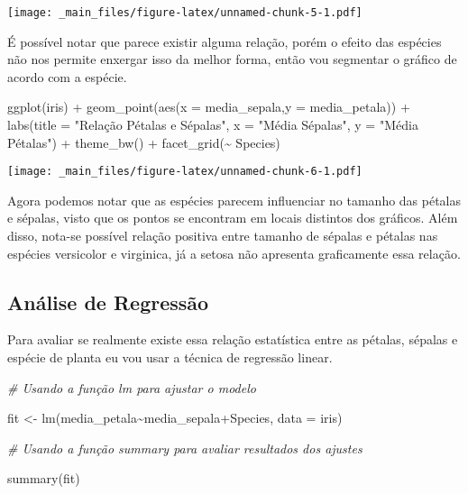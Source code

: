 \documentclass[
]{book}
\newenvironment{Shaded}{\begin{snugshade}}{\end{snugshade}}
\newcommand{\AttributeTok}[1]{\textcolor[rgb]{0.77,0.63,0.00}{#1}}
\newcommand{\CommentTok}[1]{\textcolor[rgb]{0.56,0.35,0.01}{\textit{#1}}}
\newcommand{\FunctionTok}[1]{\textcolor[rgb]{0.00,0.00,0.00}{#1}}
\newcommand{\NormalTok}[1]{#1}
\newcommand{\OtherTok}[1]{\textcolor[rgb]{0.56,0.35,0.01}{#1}}
\newcommand{\SpecialCharTok}[1]{\textcolor[rgb]{0.00,0.00,0.00}{#1}}
\newcommand{\StringTok}[1]{\textcolor[rgb]{0.31,0.60,0.02}{#1}}
\begin{document}
\texttt{[image: \_main\_files/figure-latex/unnamed-chunk-5-1.pdf]}

É possível notar que parece existir alguma relação, porém o efeito das espécies não nos permite enxergar isso da melhor forma, então vou segmentar o gráfico de acordo com a espécie.

\begin{Shaded}
\begin{Highlighting}[]
\FunctionTok{ggplot}\NormalTok{(iris) }\SpecialCharTok{+}
  \FunctionTok{geom\_point}\NormalTok{(}\FunctionTok{aes}\NormalTok{(}\AttributeTok{x =}\NormalTok{ media\_sepala,}\AttributeTok{y =}\NormalTok{ media\_petala)) }\SpecialCharTok{+}
  \FunctionTok{labs}\NormalTok{(}\AttributeTok{title =} \StringTok{"Relação Pétalas e Sépalas"}\NormalTok{,}
       \AttributeTok{x =} \StringTok{"Média Sépalas"}\NormalTok{,}
       \AttributeTok{y =} \StringTok{"Média Pétalas"}\NormalTok{) }\SpecialCharTok{+}
  \FunctionTok{theme\_bw}\NormalTok{() }\SpecialCharTok{+}
  \FunctionTok{facet\_grid}\NormalTok{(}\SpecialCharTok{\textasciitilde{}}\NormalTok{ Species)}
\end{Highlighting}
\end{Shaded}

\texttt{[image: \_main\_files/figure-latex/unnamed-chunk-6-1.pdf]}

Agora podemos notar que as espécies parecem influenciar no tamanho das pétalas e sépalas, visto que os pontos se encontram em locais distintos dos gráficos. Além disso, nota-se possível relação positiva entre tamanho de sépalas e pétalas nas espécies versicolor e virginica, já a setosa não apresenta graficamente essa relação.

\hypertarget{anuxe1lise-de-regressuxe3o}{%
\subsection{Análise de Regressão}\label{anuxe1lise-de-regressuxe3o}}

Para avaliar se realmente existe essa relação estatística entre as pétalas, sépalas e espécie de planta eu vou usar a técnica de regressão linear.

\begin{Shaded}
\begin{Highlighting}[]
\CommentTok{\# Usando a função lm para ajustar o modelo}

\NormalTok{fit }\OtherTok{\textless{}{-}} \FunctionTok{lm}\NormalTok{(media\_petala}\SpecialCharTok{\textasciitilde{}}\NormalTok{media\_sepala}\SpecialCharTok{+}\NormalTok{Species, }\AttributeTok{data =}\NormalTok{ iris)}

\CommentTok{\# Usando a função summary para avaliar resultados dos ajustes}

\FunctionTok{summary}\NormalTok{(fit)}
\end{Highlighting}
\end{Shaded}
\end{document}
